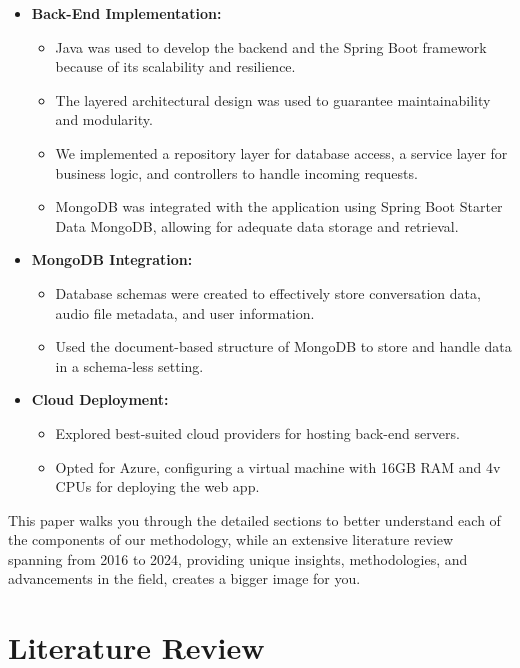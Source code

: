 \documentclass[conference]{IEEEtran}
\begin{document}
\begin{itemize}
\begin{itemize}
        \end{itemize}
        \item \textbf{Back-End Implementation:}
        \begin{itemize}
            \item Java was used to develop the backend and the Spring Boot framework because of its scalability and resilience.
            \item The layered architectural design was used to guarantee maintainability and modularity.
            \item We implemented a repository layer for database access, a service layer for business logic, and controllers to handle incoming requests.
            \item MongoDB was integrated with the application using Spring Boot Starter Data MongoDB, allowing for adequate data storage and retrieval.
        \end{itemize}
    \item \textbf{MongoDB Integration:}
    \begin{itemize}
        \item Database schemas were created to effectively store conversation data, audio file metadata, and user information.
        \item Used the document-based structure of MongoDB to store and handle data in a schema-less setting.
    \end{itemize}
    \item \textbf{Cloud Deployment:}
    \begin{itemize}
        \item Explored best-suited cloud providers for hosting back-end servers.
        \item Opted for Azure, configuring a virtual machine with 16GB RAM and 4v CPUs for deploying the web app.
    \end{itemize}
\end{itemize}

This paper walks you through the detailed sections to better understand each of the components of our methodology, while an extensive literature review spanning from 2016 to 2024, providing unique insights, methodologies, and advancements in the field, creates a bigger image for you. 

\section{Literature Review}
\end{document}
